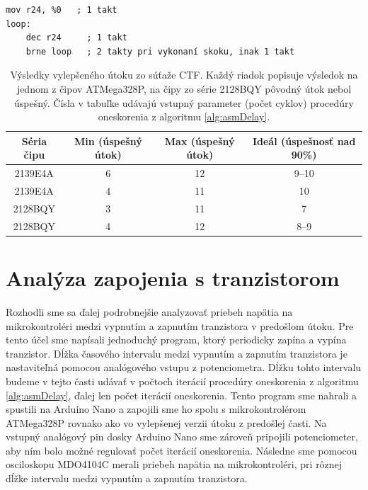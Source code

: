 \begin{lstlisting}[float,language=AVR,caption={Procedúra oneskorenia v asembleri. \%0 označuje vstupný parameter -- hodnota v registri.},label=alg:asmDelay]
mov r24, %0   ; 1 takt
loop:
    dec r24     ; 1 takt
    brne loop   ; 2 takty pri vykonaní skoku, inak 1 takt
\end{lstlisting}

\begin{table}
    \caption[Výsledky vylepšeného útoku zo súťaže CTF]{Výsledky vylepšeného útoku zo súťaže CTF. Každý riadok popisuje výsledok na jednom z čipov ATMega328P, na čipy zo série 2128BQY pôvodný útok nebol úspešný. Čísla v tabuľke udávajú vstupný parameter (počet cyklov) procedúry oneskorenia z algoritmu \ref{alg:asmDelay}.}
    \label{tab:vccOnTheCheap2}
    \begin{center}
    \begin{tabular}{|c|c|c|c|}
        \hline 
        Séria čipu & Min (úspešný útok) & Max (úspešný útok) & Ideál (úspešnosť nad 90\%) \\
        \hline
        2139E4A & 6 & 12 & 9--10 \\
        \hline
        2139E4A & 4 & 11 & 10 \\
        \hline
        2128BQY & 3 & 11 & 7 \\
        \hline
        2128BQY & 4 & 12 & 8--9 \\
        \hline
    \end{tabular}
    \end{center}
\end{table}

\section{Analýza zapojenia s tranzistorom}
Rozhodli sme sa ďalej podrobnejšie analyzovať priebeh napätia na mikrokontroléri medzi vypnutím a zapnutím tranzistora v predošlom útoku. Pre tento účel sme napísali jednoduchý program, ktorý periodicky zapína a vypína tranzistor. Dĺžka časového intervalu medzi vypnutím a zapnutím tranzistora je nastaviteľná pomocou analógového vstupu z potenciometra. Dĺžku tohto intervalu budeme v tejto časti udávať v počtoch iterácií procedúry oneskorenia z algoritmu \ref{alg:asmDelay}, ďalej len počet iterácií oneskorenia. Tento program sme nahrali a spustili na Arduino Nano a zapojili sme ho spolu s mikrokontrolérom ATMega328P rovnako ako vo vylepšenej verzii útoku z predošlej časti. Na vstupný analógový pin dosky Arduino Nano sme zároveň pripojili potenciometer, aby ním bolo možné regulovať počet iterácií oneskorenia. Následne sme pomocou osciloskopu MDO4104C merali priebeh napätia na mikrokontroléri, pri rôznej dĺžke intervalu medzi vypnutím a zapnutím tranzistora.

